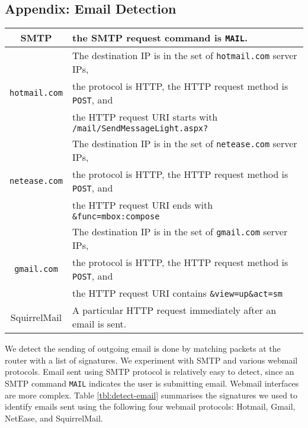 \subsection*{Appendix: Email Detection}
\label{appendix:email}

\begin{table*}[bt]
  \centering
  \begin{tabular}{|c|l|}
  \hline
  SMTP     & the SMTP request command is {\tt MAIL}. \\
  \hline
           & The destination IP is in the set of {\tt hotmail.com} server IPs,  \\
  {\tt hotmail.com}  & the protocol is HTTP,
           the HTTP request method is {\tt POST}, and \\
           & the HTTP request URI starts with {\tt /mail/SendMessageLight.aspx?} \\
  \hline
           & The destination IP is in the set of {\tt netease.com} server IPs, \\
  {\tt netease.com}  & the protocol is HTTP,
           the HTTP request method is {\tt POST}, and \\
           & the HTTP request URI ends with {\tt \&func=mbox:compose} \\
  \hline
           & The destination IP is in the set of {\tt gmail.com} server IPs, \\
  {\tt gmail.com}    & the protocol is HTTP,
           the HTTP request method is {\tt POST}, and \\
           & the HTTP request URI contains {\tt \&view=up\&act=sm} \\
  \hline
  SquirrelMail & A particular HTTP request immediately after an email is sent. \\ [0.5ex]
  \hline
  \end{tabular}
  \caption{Rules for email detection. }\label{tbl:detect-email}
\end{table*}

We detect the sending of outgoing email is done by matching packets 
at the router with a list of signatures. 
We experiment with SMTP and various webmail protocols.
Email sent using SMTP protocol is relatively easy to detect, since
an SMTP command {\tt MAIL} indicates the user is submitting email.
Webmail interfaces are more complex.
Table \ref{tbl:detect-email} summarises
the signatures we used to identify emails sent using the following
four webmail protocols: Hotmail, Gmail, NetEase, and SquirrelMail.

